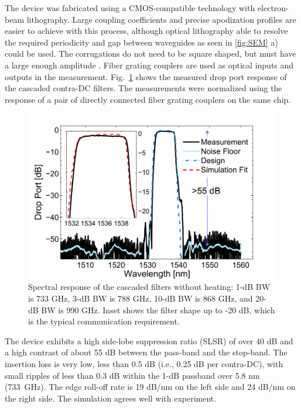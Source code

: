 \documentclass[9pt,twocolumn,twoside]{osajnl}
\begin{document}
	
	
	The device was fabricated using a CMOS-compatible technology with electron-beam lithography. 
	Large coupling coefficients and precise apodization profiles are easier to achieve with this process, although optical lithography able to resolve the required periodicity and gap between waveguides as seen in \ref{fig:SEM} a) could be used. The corrugations do not need to be square shaped, but must have a large enough amplitude
	.
	Fiber grating couplers \cite{zhong2014focusingFGC} are used as optical inputs and outputs in the measurement. 
	Fig.~\ref{fig:passive} shows the measured drop port response of the cascaded contra-DC filters. 
	The measurements were normalized using the response of a pair of directly connected fiber grating couplers on the same chip.
	\begin{figure}[htbp]
		\centering
		\includegraphics[width=.99\columnwidth]{data/Passive62}
		\caption{ Spectral response of the cascaded filters without heating: 1-dB BW is 733 GHz, 3-dB BW is 788 GHz, 10-dB BW is 868 GHz, and 20-dB BW is 990 GHz. Inset shows the filter shape up to -20 dB, which is the typical communication requirement.}
		\label{fig:passive}
	\end{figure}
	
	The device exhibits a high side-lobe suppression ratio (SLSR) of over 40 dB and a high contrast of about 55 dB between the pass-band and the stop-band. 
	The insertion loss is very low, less than 0.5 dB (i.e., 0.25 dB per contra-DC), with small ripples of less than 0.3 dB within the 1-dB passband over 5.8 nm (733~GHz). 
	The edge roll-off rate is 19 dB/nm on the left side and 24 dB/nm on the right side.
	The simulation agrees well with experiment.
	
\end{document}

